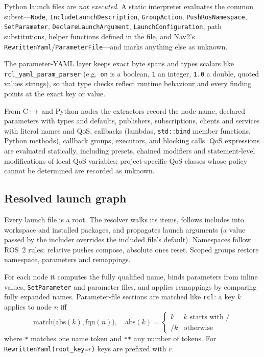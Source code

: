 ﻿\documentclass[conference]{IEEEtran}
\newcommand{\code}[1]{\texttt{#1}}
\begin{document}
Python launch files are \emph{not executed}. A static interpreter evaluates the common
subset---\code{Node}, \code{IncludeLaunchDescription}, \code{GroupAction},
\code{PushRosNamespace}, \code{SetParameter}, \code{DeclareLaunchArgument},
\code{LaunchConfiguration}, path substitutions, helper functions defined in the file, and
Nav2's \code{RewrittenYaml}/\code{ParameterFile}---and marks anything else as unknown.

The parameter-YAML layer keeps exact byte spans and types scalars like
\code{rcl\_yaml\_param\_parser} (e.g.\ \code{on} is a boolean, \code{1} an integer, \code{1.0}
a double, quoted values strings), so that type checks reflect runtime behaviour and every finding
points at the exact key or value.

From C++ and Python nodes the extractors record the node name, declared parameters with types
and defaults, publishers, subscriptions, clients and services with literal names and QoS,
callbacks (lambdas, \code{std::bind} member functions, Python methods), callback groups,
executors, and blocking calls. QoS expressions are evaluated statically, including presets,
chained modifiers and statement-level modifications of local QoS variables; project-specific
QoS classes whose policy cannot be determined are recorded as unknown.

\subsection{Resolved launch graph}
\label{sec:graph}

Every launch file is a root. The resolver walks its items, follows includes into workspace and
installed packages, and propagates launch arguments (a value passed by the includer overrides
the included file's default). Namespaces follow ROS~2 rules: relative pushes compose, absolute
ones reset. Scoped groups restore namespace, parameters and remappings.

For each node it computes the fully qualified name, binds parameters from inline values,
\code{SetParameter} and parameter files, and applies remappings by comparing fully expanded
names. Parameter-file sections are matched like \code{rcl}: a key $k$ applies to node $n$ iff
\begin{equation}
\mathrm{match}\big(\mathrm{abs}(k), \mathrm{fqn}(n)\big),\quad
\mathrm{abs}(k) = \begin{cases} k & k \text{ starts with } / \\ /k & \text{otherwise}\end{cases}
\end{equation}
where \code{*} matches one name token and \code{**} any number of tokens. For
\code{RewrittenYaml(root\_key=$r$)} keys are prefixed with $r$.
\end{document}

